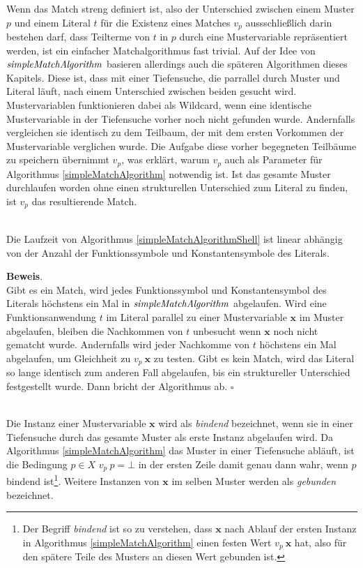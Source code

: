 Wenn das Match streng definiert ist, also der Unterschied zwischen einem Muster $p$ und einem Literal $t$ für die Existenz eines Matches $v_p$ aussschließlich darin bestehen darf, dass Teilterme von $t$ in $p$ durch eine Mustervariable repräsentiert werden, ist ein einfacher Matchalgorithmus fast trivial. Auf der Idee von $\mathit{simpleMatchAlgorithm}$ basieren allerdings auch die späteren Algorithmen dieses Kapitels. Diese ist, dass mit einer Tiefensuche, die parrallel durch Muster und Literal läuft, nach einem Unterschied zwischen beiden gesucht wird. Mustervariablen funktionieren dabei als Wildcard, wenn eine identische Mustervariable in der Tiefensuche vorher noch nicht gefunden wurde. Andernfalls vergleichen sie identisch zu dem Teilbaum, der mit dem ersten Vorkommen der Mustervariable verglichen wurde. Die Aufgabe diese vorher begegneten Teilbäume zu speichern übernimmt $v_p$, was erklärt, warum $v_p$ auch als Parameter für Algorithmus \ref{simpleMatchAlgorithm} notwendig ist. Ist das gesamte Muster durchlaufen worden ohne einen strukturellen Unterschied zum Literal zu finden, ist $v_p$ das resultierende Match.\\

\begin{lemma}~\\
Die Laufzeit von Algorithmus \ref{simpleMatchAlgorithmShell} ist linear abhängig von der Anzahl der Funktionssymbole und Konstantensymbole des Literals.
\end{lemma}

\textbf{Beweis}.\\
Gibt es ein Match, wird jedes Funktionssymbol und Konstantensymbol des Literals höchstens ein Mal in $\mathit{simpleMatchAlgorithm}$ abgelaufen. Wird eine Funktionsanwendung $t$ im Literal parallel zu einer Mustervariable $\mathbf x$ im Muster abgelaufen, bleiben die Nachkommen von $t$ unbesucht wenn $\mathbf x$ noch nicht gematcht wurde. Andernfalls wird jeder Nachkomme von $t$ höchstens ein Mal abgelaufen, um Gleichheit zu $v_p~\mathbf x$ zu testen.
Gibt es kein Match, wird das Literal so lange identisch zum anderen Fall abgelaufen, bis ein struktureller Unterschied festgestellt wurde. Dann bricht der Algorithmus ab.
\hfill $\square$\\


\begin{definition}~\\
Die Instanz einer Mustervariable $\mathbf x$ wird als \emph{bindend}  bezeichnet, wenn sie in einer Tiefensuche durch das gesamte Muster als erste Instanz abgelaufen wird. Da Algorithmus \ref{simpleMatchAlgorithm} das Muster in einer Tiefensuche abläuft, ist die Bedingung $p \in X$ \KwAnd $v_p~p = \bot$ in der ersten Zeile damit genau dann wahr, wenn $p$ bindend ist\footnote{Der Begriff \emph{bindend} ist so zu verstehen, dass $\mathbf x$ nach Ablauf der ersten Instanz in Algorithmus \ref{simpleMatchAlgorithm} einen festen Wert $v_p~\mathbf x$ hat, also für den spätere Teile des Musters an diesen Wert gebunden ist.}. Weitere Instanzen von $\mathbf x$ im selben Muster werden als \emph{gebunden} bezeichnet.
\end{definition}



